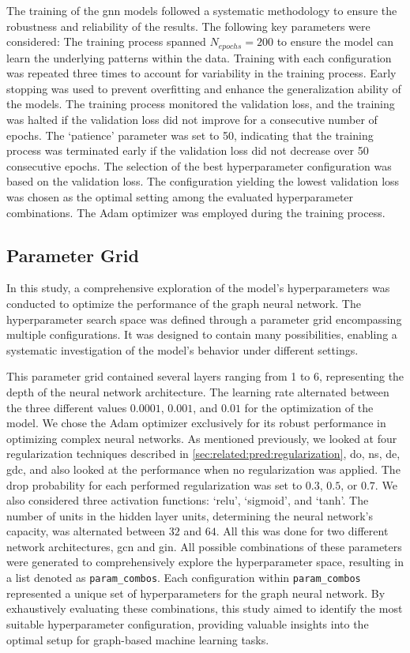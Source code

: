 The training of the \ac{gnn} models followed a systematic methodology to ensure the robustness and reliability of the results.
The following key parameters were considered:
The training process spanned  $N_{epochs}= 200$ to ensure the model can learn the underlying patterns within the data.
Training with each configuration was repeated three times to account for variability in the training process.
Early stopping was used to prevent overfitting and enhance the generalization ability of the models.
The training process monitored the validation loss, and the training was halted if the validation loss did not improve for a consecutive number of epochs.
The `patience' parameter was set to 50, indicating that the training process was terminated early if the validation loss did not decrease over 50 consecutive epochs.
The selection of the best hyperparameter configuration was based on the validation loss.
The configuration yielding the lowest validation loss was chosen as the optimal setting among the evaluated hyperparameter combinations.
The Adam optimizer was employed during the training process.

\subsection{Parameter Grid}
In this study, a comprehensive exploration of the model's hyperparameters was conducted to optimize the performance of the graph neural network.
The hyperparameter search space was defined through a parameter grid encompassing multiple configurations.
It was designed to contain many possibilities, enabling a systematic investigation of the model's behavior under different settings.

This parameter grid contained several layers ranging from 1 to 6, representing the depth of the neural network architecture.
The learning rate alternated between the three different values $0.0001$, $0.001$, and $0.01$ for the optimization of the model.
We chose the Adam optimizer exclusively for its robust performance in optimizing complex neural networks.
As mentioned previously, we looked at four regularization techniques described in \cref{sec:related:pred:regularization}, \ac{do}, \ac{ns}, \ac{de}, \ac{gdc}, and also looked at the performance when no regularization was applied.
The drop probability for each performed regularization was set to $0.3$, $0.5$, or $0.7$.
We also considered three activation functions: `relu', `sigmoid', and `tanh'.
The number of units in the hidden layer units, determining the neural network's capacity, was alternated between $32$ and $64$.
All this was done for two different network architectures, \ac{gcn} and \ac{gin}.
All possible combinations of these parameters were generated to comprehensively explore the hyperparameter space, resulting in a list denoted as \texttt{param_combos}.
Each configuration within \texttt{param_combos} represented a unique set of hyperparameters for the graph neural network.
By exhaustively evaluating these combinations, this study aimed to identify the most suitable hyperparameter configuration, providing valuable insights into the optimal setup for graph-based machine learning tasks.

